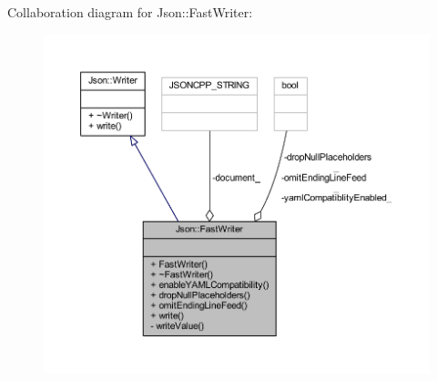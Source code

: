 Collaboration diagram for Json\+:\+:Fast\+Writer\+:\nopagebreak
\begin{figure}[H]
\begin{center}
\leavevmode
\includegraphics[width=350pt]{class_json_1_1_fast_writer__coll__graph}
\end{center}
\end{figure}
